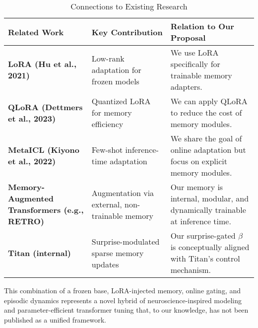 \begin{table}[h]
\centering
\caption{Connections to Existing Research}
\label{tab:discussion_related_work}
\begin{tabular}{p{} p{} p{}}
\toprule
\textbf{Related Work} & \textbf{Key Contribution} & \textbf{Relation to Our Proposal} \\
\midrule
\textbf{LoRA (Hu et al., 2021)} & Low-rank adaptation for frozen models & We use LoRA specifically for trainable memory adapters. \\
\textbf{QLoRA (Dettmers et al., 2023)} & Quantized LoRA for memory efficiency & We can apply QLoRA to reduce the cost of memory modules. \\
\textbf{MetaICL (Kiyono et al., 2022)} & Few-shot inference-time adaptation & We share the goal of online adaptation but focus on explicit memory modules. \\
\textbf{Memory-Augmented Transformers (e.g., RETRO)} & Augmentation via external, non-trainable memory & Our memory is internal, modular, and dynamically trainable at inference time. \\
\textbf{Titan (internal)} & Surprise-modulated sparse memory updates & Our surprise-gated \(\beta\) is conceptually aligned with Titan's control mechanism. \\
\bottomrule
\end{tabular}
\end{table}

This combination of a frozen base, LoRA-injected memory, online gating,
and episodic dynamics represents a novel hybrid of neuroscience-inspired
modeling and parameter-efficient transformer tuning that, to our
knowledge, has not been published as a unified framework.
